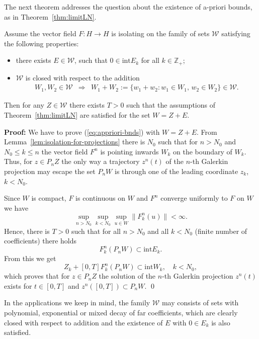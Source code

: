 The next theorem addresses the question about the existence of a-priori bounds, as in Theorem~\ref{thm:limitLN}.

\begin{theorem}\label{thm:isolationGivesAPB}
	Assume the vector field $F:H\to H$ is isolating on the family of sets $\mathcal W$ satisfying the following properties:
	\begin{itemize}
		\item there exists $E\in \mathcal W$, such that $0\in\mathrm{int}E_k$ for all $k\in\mathbb Z_+$;
		\item $\mathcal W$ is closed with respect to the addition
		\begin{eqnarray*}
			W_1,W_2\in \mathcal W &\Longrightarrow&  W_1+W_2:=\{w_1+w_2: w_1\in W_1,\, w_2\in W_2 \}\in\mathcal W.
		\end{eqnarray*}
	\end{itemize}		
	Then for any $Z\in\mathcal W$ there exists $T>0$ such that the assumptions of Theorem~\ref{thm:limitLN} are satisfied for the set $W=Z+E$.
\end{theorem}
\textbf{Proof:}
We have to prove (\ref{eq:appriori-bnds}) with $W=Z+E$. From Lemma~\ref{lem:isolation-for-projections} there is $N_0$ such that for $n>N_0$ and $N_0\leq k\leq n$ the vector field $F^n$ is pointing inwards $W_k$ on the boundary of $W_k$. Thus, for $z\in P_nZ$ the only way a trajectory $z^n(t)$ of the $n$-th Galerkin projection may escape the set $P_nW$ is through one of the leading coordinate $z_k$, $k< N_0$.

Since $W$ is compact, $F$ is continuous on $W$ and $F^n$ converge uniformly to $F$ on $W$ we have
\begin{equation*}
	\sup_{n>N_0}\sup_{k< N_0}\sup_{u\in W}\|F_k^n(u)\| < \infty.
\end{equation*}
Hence, there is $T>0$ such that for all $n>N_0$ and all $k< N_0$ (finite number of coefficients) there holds
\begin{equation*}
	[0,T]F^n_k(P_nW)\subset \mathrm{int}E_k.
\end{equation*}
From this we get
\begin{equation*}
	Z_k+[0,T]F^n_k(P_nW)\subset \mathrm{int}W_k, \quad k<N_0,
\end{equation*}
which proves that for $z\in P_nZ$ the solution of the $n$-th Galerkin projection $z^n(t)$ exists for $t\in[0,T]$ and $z^n([0,T])\subset P_nW$.
\qed

In the applications we keep in mind, the family $\mathcal W$ may consists of sets with polynomial, exponential or mixed decay of far coefficients, which are clearly closed with respect to addition and the existence of $E$ with $0\in E_k$ is also satisfied.

